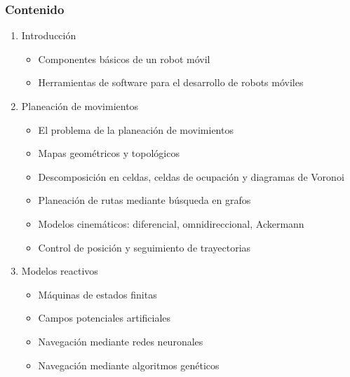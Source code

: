 \begin{frame}\frametitle{Contenido}
  \begin{enumerate}
  \item Introducción
    \begin{itemize}
    \item Componentes básicos de un robot móvil
    \item Herramientas de software para el desarrollo de robots móviles
    \end{itemize}
  \item Planeación de movimientos
    \begin{itemize}
    \item El problema de la planeación de movimientos
    \item Mapas geométricos y topológicos
    \item Descomposición en celdas, celdas de ocupación y diagramas de Voronoi
    \item Planeación de rutas mediante búsqueda en grafos
    \item Modelos cinemáticos: diferencial, omnidireccional, Ackermann
    \item Control de posición y seguimiento de trayectorias
    \end{itemize}
  \item Modelos reactivos
    \begin{itemize}
    \item Máquinas de estados finitas
    \item Campos potenciales artificiales
    \item Navegación mediante redes neuronales
    \item Navegación mediante algoritmos genéticos
    \end{itemize}
  \end{enumerate}
\end{frame}

